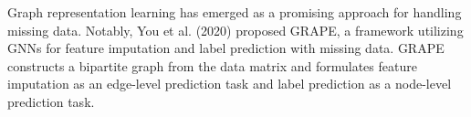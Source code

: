 %	
%	

Graph representation learning has emerged as a promising approach for handling missing data. Notably, You et al. (2020) \cite{GRAPE} proposed GRAPE, a framework utilizing GNNs for feature imputation and label prediction with missing data. GRAPE constructs a bipartite graph from the data matrix and formulates feature imputation as an edge-level prediction task and label prediction as a node-level prediction task.

